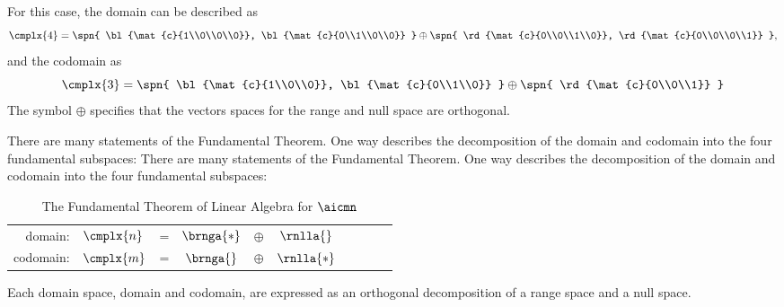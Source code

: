 For this case, the domain can be described as
  \begin{equation*}   %
      \cmplx{4} = \spn{ \bl{\mat{c}{1\\0\\0\\0}}, \bl{\mat{c}{0\\1\\0\\0}} } \oplus \spn{ \rd{\mat{c}{0\\0\\1\\0}}, \rd{\mat{c}{0\\0\\0\\1}} },
  \end{equation*}
and the codomain as
  \begin{equation*}   %
      \cmplx{3} = \spn{ \bl{\mat{c}{1\\0\\0}}, \bl{\mat{c}{0\\1\\0}} } \oplus \spn{ \rd{\mat{c}{0\\0\\1}} }
  \end{equation*}
The symbol $\oplus$ specifies that the vectors spaces for the range and null space are orthogonal.

There are many statements of the Fundamental Theorem. One way describes the decomposition of the domain and codomain into the four fundamental subspaces:
There are many statements of the Fundamental Theorem. One way describes the decomposition of the domain and codomain into the four fundamental subspaces:
\begin{table}[htbp]  %
    \caption[The Fundamental Theorem of Linear Algebra]{The Fundamental Theorem of Linear Algebra for $\aicmn$ }
    \begin{center}
    		\begin{tabular}{rlcccccccc}
    		  domain:   & $\cmplx{n}$ & = & $\brnga{*}$ & $\oplus$ & $\rnlla{}$ \\
    		  codomain: & $\cmplx{m}$ & = & $\brnga{}$  & $\oplus$ & $\rnlla{*}$
      \end{tabular}
    \end{center}
  \label{tab:ftola}
  \end{table}%
Each domain space, domain and codomain, are expressed as an orthogonal decomposition of a range space and a null space.

